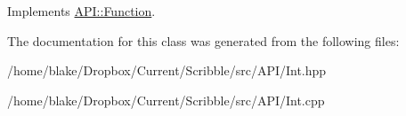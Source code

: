 Implements \hyperlink{class_a_p_i_1_1_function_ae56761ad4c849c05e12cb4cd02583c77}{A\-P\-I\-::\-Function}.



The documentation for this class was generated from the following files\-:\begin{DoxyCompactItemize}
\item 
/home/blake/\-Dropbox/\-Current/\-Scribble/src/\-A\-P\-I/Int.\-hpp\item 
/home/blake/\-Dropbox/\-Current/\-Scribble/src/\-A\-P\-I/Int.\-cpp\end{DoxyCompactItemize}

